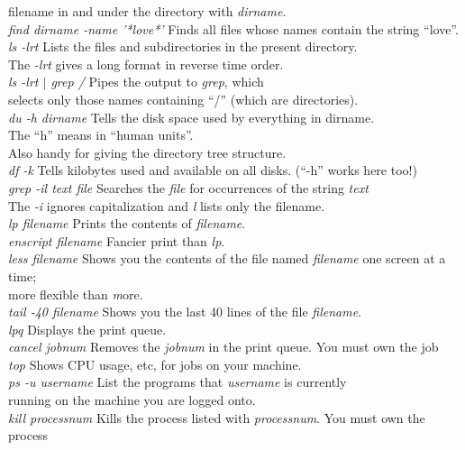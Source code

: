 \documentclass[]{article}
\begin{document}
\begin{tabbing}
{filename} in and under the directory with {\it dirname}. \\
{\it find dirname -name '*love*'} \> Finds all files whose names 
contain the string ``love''. \\
{\it ls -lrt} \> Lists the files and subdirectories 
in the present directory. \\
\>The {\it -lrt} gives a long format in reverse time order.\\
{\it ls -lrt $|$ grep /} \> Pipes the output to {\it grep}, which \\
\> selects only those names containing ``/'' (which are directories). \\
{\it du -h dirname} \> Tells the disk space used by everything in dirname. \\
\>The ``h'' means in ``human units''. \\ 
\>Also handy for giving the directory tree structure. \\

{\it df -k} \> Tells kilobytes used and available on all
disks. (``-h'' works here too!)\\
{\it grep -il text file} \> Searches the {\it file} for occurrences of
the string {\it text} \\
\> The {\it -i} ignores capitalization and {\it l} lists only the filename.\\
{\it lp filename} \> Prints the contents of {\it filename}. \\
{\it enscript filename} \> Fancier print than {\it lp}. \\
{\it less filename} \> Shows you the contents of the file named 
{\it filename} one screen at a time; \\
\> more flexible than {\textit more}. \\
{\it tail -40 filename} \> Shows you the last 40 lines of the file
{\it filename}. \\
{\it lpq} \> Displays the print queue. \\
{\it cancel jobnum} \> Removes the {\it jobnum} in the print
queue. You must own the job \\

{\it top} \> Shows CPU usage, etc, for jobs on your machine. \\
{\it ps -u username} \> List the programs that {\it username} is
currently \\
\>  running on the machine you are logged onto. \\
{\it kill processnum} \> Kills the process listed with
{\it processnum}. You must own the process \\
\end{tabbing}
	
\end{document}
